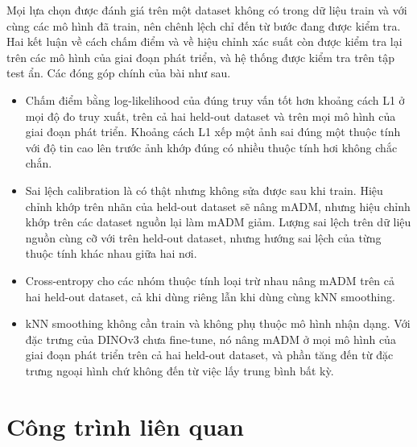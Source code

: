 \documentclass[10pt,twocolumn,letterpaper]{article}
\begin{document}
Mọi lựa chọn được đánh giá trên một dataset không có trong dữ liệu train và với cùng các mô hình đã train, nên chênh lệch chỉ đến từ bước đang được kiểm tra. Hai kết luận về cách chấm điểm và về hiệu chỉnh xác suất còn được kiểm tra lại trên các mô hình của giai đoạn phát triển, và hệ thống được kiểm tra trên tập test ẩn. Các đóng góp chính của bài như sau.
\begin{itemize}
\item Chấm điểm bằng log-likelihood của đúng truy vấn tốt hơn khoảng cách L1 ở mọi độ đo truy xuất, trên cả hai held-out dataset và trên mọi mô hình của giai đoạn phát triển. Khoảng cách L1 xếp một ảnh sai đúng một thuộc tính với độ tin cao lên trước ảnh khớp đúng có nhiều thuộc tính hơi không chắc chắn.
\item Sai lệch calibration là có thật nhưng không sửa được sau khi train. Hiệu chỉnh khớp trên nhãn của held-out dataset sẽ nâng mADM, nhưng hiệu chỉnh khớp trên các dataset nguồn lại làm mADM giảm. Lượng sai lệch trên dữ liệu nguồn cùng cỡ với trên held-out dataset, nhưng hướng sai lệch của từng thuộc tính khác nhau giữa hai nơi.
\item Cross-entropy cho các nhóm thuộc tính loại trừ nhau nâng mADM trên cả hai held-out dataset, cả khi dùng riêng lẫn khi dùng cùng kNN smoothing.
\item kNN smoothing không cần train và không phụ thuộc mô hình nhận dạng. Với đặc trưng của DINOv3 chưa fine-tune, nó nâng mADM ở mọi mô hình của giai đoạn phát triển trên cả hai held-out dataset, và phần tăng đến từ đặc trưng ngoại hình chứ không đến từ việc lấy trung bình bất kỳ.
\end{itemize}

\section{Công trình liên quan}
\label{sec:related}
\end{document}
